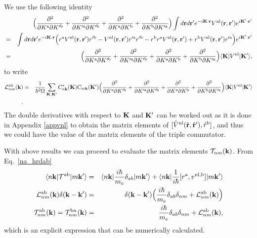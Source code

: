 We use the following identity
\begin{eqnarray}\label{3.4}
&&
\Big(
\frac{\partial^2}{\partial K^{\mathrm{a}}\partial K'^{\mathrm{b}}}
+
\frac{\partial^2}{\partial K'^{\mathrm{a}}\partial K'^{\mathrm{b}}}
+
\frac{\partial^2}{\partial K^{\mathrm{a}}\partial K^{\mathrm{b}}}
+
\frac{\partial^2}{\partial K^{\mathrm{b}}\partial K'^{\mathrm{a}}}
\Big)
\int
d\mathbf{r} d\mathbf{r}'
 e^{-i\mathbf{K}\cdot\mathbf{r}}
V^{\mathrm{nl}}(\mathbf{r},\mathbf{r}')
e^{i\mathbf{K}'\cdot\mathbf{r}'}
\nonumber\\
&=&
\int d\mathbf{r} d\mathbf{r}'
 e^{-i\mathbf{K}\cdot\mathbf{r}}
\Big( 
r^{\mathrm{a}} 
V^{\mathrm{nl}}(\mathbf{r},\mathbf{r}') 
r'^{\mathrm{b}}
- 
V^{\mathrm{nl}}(\mathbf{r},\mathbf{r}') 
r'^{\mathrm{a}} 
r'^{\mathrm{b}}
- 
r^{\mathrm{b}} 
r^{\mathrm{a}} 
V^{\mathrm{nl}}(\mathbf{r},\mathbf{r}')
+
 r^{\mathrm{b}} 
V^{\mathrm{nl}}(\mathbf{r},\mathbf{r}') 
r'^{\mathrm{a}}
\Big)  
e^{i\mathbf{K}'\cdot\mathbf{r}'}
\nonumber\\
&=&
\Big(
\frac{\partial^2}{\partial K^{\mathrm{a}}\partial K'^{\mathrm{b}}}
+
\frac{\partial^2}{\partial K'^{\mathrm{a}}\partial K'^{\mathrm{b}}}
+
\frac{\partial^2}{\partial K^{\mathrm{a}}\partial K^{\mathrm{b}}}
+
\frac{\partial^2}{\partial K^{\mathrm{b}}\partial K'^{\mathrm{a}}}
\Big)
\langle \mathbf{K} | 
V^{\mathrm{nl}}
| \mathbf{K}' \rangle 
,
\end{eqnarray}
to write
\begin{eqnarray}\label{3.7}
{\cal L}^{\mathrm{a}\mathrm{b}}_{nm}(\mathbf{k})
&=&
\frac{1}{\hbar^2\Omega}
\sum_{\mathbf{K},\mathbf{K}'} 
C^*_{n\mathbf{k}}(\mathbf{K}) 
C_{m\mathbf{k}}(\mathbf{K}')
\Big(
\frac{\partial^2}{\partial K^{\mathrm{a}}\partial K'^{\mathrm{b}}}
+
\frac{\partial^2}{\partial K'^{\mathrm{a}}\partial K'^{\mathrm{b}}}
+
\frac{\partial^2}{\partial K^{\mathrm{a}}\partial K^{\mathrm{b}}}
+
\frac{\partial^2}{\partial K^{\mathrm{b}}\partial K'^{\mathrm{a}}}
\Big)
\langle \mathbf{K} | 
V^{\mathrm{nl}}
| \mathbf{K}' \rangle 
\nonumber\\
.
\end{eqnarray} 
The double derivatives with respect to $\mathbf{K}$ and $\mathbf{K}'$ can be worked out as
it is done in Appendix \ref{appvnl}  
to obtain the matrix elements of
$[\hat V^{\mathrm{nl}}(\hat{\mathbf{r}},\hat{\mathbf{r}}'),\hat r^{\mathrm{b}}]$,\cite{olevano} 
and thus we
could have the value of the matrix elements of the triple commutator.\cite{valerie}

With above results we can proceed to evaluate the matrix elements  ${\cal T}_{nm}(\mathbf{k})$.
From Eq.~\eqref{na_hrdab}
\begin{eqnarray}\label{na_hrdabn}
\langle n\mathbf{k} |
{\cal T}^{\mathrm{a}\mathrm{b}}
| m\mathbf{k}' \rangle
&=&
\langle n\mathbf{k} |
\frac{i\hbar}{m_e}\delta_{ab}
| m\mathbf{k}' \rangle
+
\langle n\mathbf{k} |
\frac{1}{i\hbar}[r^{\mathrm{a}},v^{\mathrm{nl},\mathrm{b}}]
| m\mathbf{k}' \rangle
\nonumber\\
{\cal L}^{\mathrm{a}\mathrm{b}}_{nm}(\mathbf{k})
\delta(\mathbf{k}-\mathbf{k}')
&=&
\delta(\mathbf{k}-\mathbf{k}')
\Big(
\frac{i\hbar}{m_e}\delta_{ab}\delta_{nm}
+
{\cal L}_{nm}^{\mathrm{a}\mathrm{b}}(\mathbf{k})\Big)
\nonumber\\
{\cal T}^{\mathrm{a}\mathrm{b}}_{nm}(\mathbf{k})
={\cal T}^{\mathrm{b}\mathrm{a}}_{nm}(\mathbf{k})
&=&
\frac{i\hbar}{m_e}\delta_{ab}\delta_{nm}
+
{\cal L}_{nm}^{\mathrm{a}\mathrm{b}}(\mathbf{k})
,
\end{eqnarray}
which is an explicit expression that can be numerically calculated.
